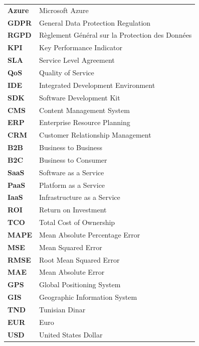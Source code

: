 \begin{longtable}{ll}
\textbf{Azure} & Microsoft Azure \\
\textbf{GDPR} & General Data Protection Regulation \\
\textbf{RGPD} & Règlement Général sur la Protection des Données \\
\textbf{KPI} & Key Performance Indicator \\
\textbf{SLA} & Service Level Agreement \\
\textbf{QoS} & Quality of Service \\
\textbf{IDE} & Integrated Development Environment \\
\textbf{SDK} & Software Development Kit \\
\textbf{CMS} & Content Management System \\
\textbf{ERP} & Enterprise Resource Planning \\
\textbf{CRM} & Customer Relationship Management \\
\textbf{B2B} & Business to Business \\
\textbf{B2C} & Business to Consumer \\
\textbf{SaaS} & Software as a Service \\
\textbf{PaaS} & Platform as a Service \\
\textbf{IaaS} & Infrastructure as a Service \\
\textbf{ROI} & Return on Investment \\
\textbf{TCO} & Total Cost of Ownership \\
\textbf{MAPE} & Mean Absolute Percentage Error \\
\textbf{MSE} & Mean Squared Error \\
\textbf{RMSE} & Root Mean Squared Error \\
\textbf{MAE} & Mean Absolute Error \\
\textbf{GPS} & Global Positioning System \\
\textbf{GIS} & Geographic Information System \\
\textbf{TND} & Tunisian Dinar \\
\textbf{EUR} & Euro \\
\textbf{USD} & United States Dollar \\
\end{longtable}
